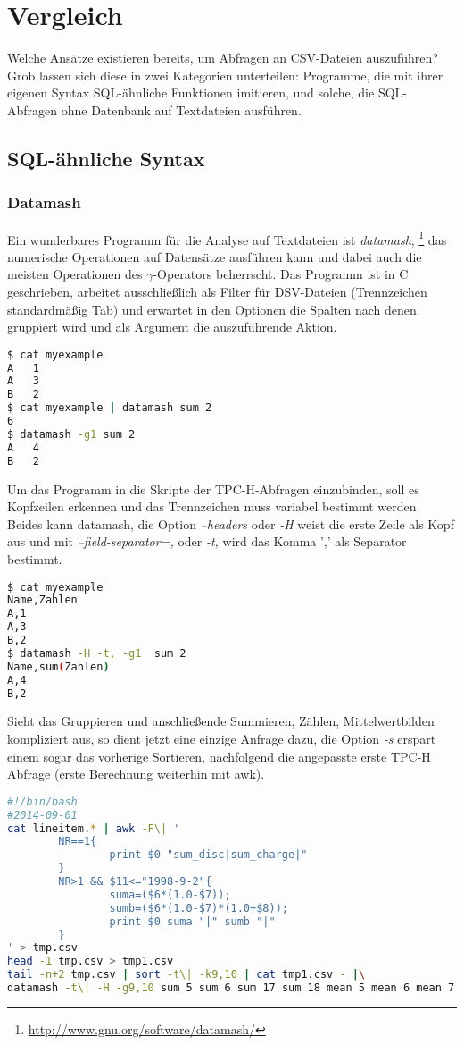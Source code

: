 \chapter{Vergleich}
Welche Ansätze existieren bereits, um Abfragen an CSV-Dateien auszuführen? Grob lassen sich diese in zwei Kategorien unterteilen: Programme, die mit ihrer eigenen Syntax SQL-ähnliche Funktionen imitieren, und solche, die SQL-Abfragen ohne Datenbank auf Textdateien ausführen.

\section{SQL-ähnliche Syntax}
\subsection{Datamash}
Ein wunderbares Programm für die Analyse auf Textdateien ist \textit{datamash},
\footnote{\url{http://www.gnu.org/software/datamash/}}
das numerische Operationen auf Datensätze ausführen kann und dabei auch die meisten Operationen des $\gamma$-Operators beherrscht. Das Programm ist in C geschrieben, arbeitet ausschließlich als Filter für DSV-Dateien (Trennzeichen standardmäßig Tab) und erwartet in den Optionen die Spalten nach denen gruppiert wird und als Argument die auszuführende Aktion.
\begin{lstlisting}[language=Bash]
$ cat myexample
A	1
A	3
B	2
$ cat myexample | datamash sum 2
6
$ datamash -g1 sum 2
A	4
B	2
\end{lstlisting}

Um das Programm in die Skripte der TPC-H-Abfragen einzubinden, soll es Kopfzeilen erkennen und das Trennzeichen muss variabel bestimmt werden. Beides kann datamash, die Option \textit{--headers} oder \textit{-H} weist die erste Zeile als Kopf aus und mit \textit{--field-separator=,} oder \textit{-t,} wird das Komma ',' als Separator bestimmt.
\begin{lstlisting}[language=Bash]
$ cat myexample
Name,Zahlen
A,1
A,3
B,2
$ datamash -H -t, -g1  sum 2
Name,sum(Zahlen)
A,4
B,2
\end{lstlisting}

Sieht das Gruppieren und anschließende Summieren, Zählen, Mittelwertbilden kompliziert aus, so dient jetzt eine einzige Anfrage dazu, die Option \textit{-s} erspart einem sogar das vorherige Sortieren, nachfolgend die angepasste erste TPC-H Abfrage (erste Berechnung weiterhin mit awk).

\begin{lstlisting}[language=Bash]
#!/bin/bash
#2014-09-01
cat lineitem.* | awk -F\| '
        NR==1{
                print $0 "sum_disc|sum_charge|"
        }
        NR>1 && $11<="1998-9-2"{
                suma=($6*(1.0-$7));
                sumb=($6*(1.0-$7)*(1.0+$8));
                print $0 suma "|" sumb "|"
        }
' > tmp.csv
head -1 tmp.csv > tmp1.csv
tail -n+2 tmp.csv | sort -t\| -k9,10 | cat tmp1.csv - |\
datamash -t\| -H -g9,10 sum 5 sum 6 sum 17 sum 18 mean 5 mean 6 mean 7 count 1
\end{lstlisting}

